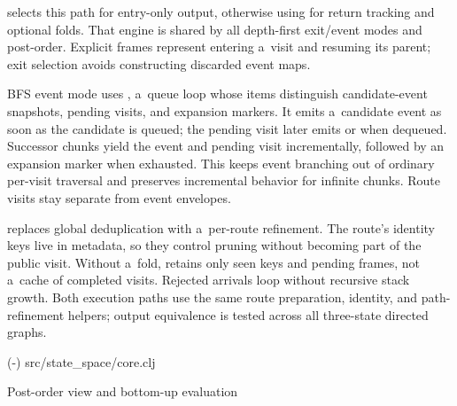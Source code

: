 { selects this path for entry-only output, otherwise using
 for return tracking and optional folds. That
engine is shared by all depth-first exit/event modes and post-order.
Explicit frames represent entering a~visit and resuming its parent; exit
selection avoids constructing discarded event maps.

BFS event mode uses , a~queue loop whose items
distinguish candidate-event snapshots, pending visits, and expansion markers.
It emits a~candidate event as soon as the candidate is queued; the pending
visit later emits  or  when dequeued. Successor chunks
yield the event and pending visit incrementally, followed by an expansion
marker when exhausted. This keeps event branching out of ordinary per-visit
traversal and preserves incremental behavior for infinite chunks. Route
visits stay separate from event envelopes.

 replaces global deduplication with a~per-route
refinement. The route's identity keys live in metadata, so they control
pruning without becoming part of the public visit. Without a~fold,
 retains only seen keys and pending frames, not
a~cache of completed visits. Rejected arrivals loop without recursive stack
growth. Both execution paths use the same route preparation, identity, and
path-refinement helpers; output equivalence is tested across all three-state
directed graphs.

\begingroup
\typosize[8/9]
\verbinput {} (\the\sourcefirstline-\the\sourcelastline) src/state_space/core.clj
\endgroup

\secc Post-order view and bottom-up evaluation

}
